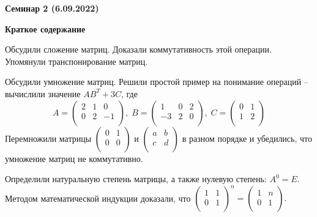 \documentclass[10pt, a4paper]{extarticle}
\theoremstyle{definition}
\begin{document}
\begin{center}
\small
\noindent{}
\end{center}

\large

\begin{center}
\textbf{Семинар 2 (6.09.2022)}
\end{center}

	\textbf{Краткое содержание}

    Обсудили сложение матриц. Доказали коммутативность этой операции. Упомянули транспонирование матриц.
    
    Обсудили умножение матриц. Решили простой пример на понимание операций -- вычислили значение $AB^T + 3C$, где
    \[
    A = \begin{pmatrix}
        2 & 1 & 0 \\
        0 & 2 & -1 \\
    \end{pmatrix}, \;
    B = \begin{pmatrix}
        1 & 0 & 2 \\
        -3 & 2 & 0 \\
    \end{pmatrix}, \;
    C = \begin{pmatrix}
        0 & 1 \\
        1 & 2 \\
    \end{pmatrix}
    \]
    Перемножили матрицы 
    $\begin{pmatrix}
        0 & 1 \\
        0 & 0 \\
    \end{pmatrix}$ 
    и
    $\begin{pmatrix}
        a & b \\
        c & d \\
    \end{pmatrix}$
    в разном порядке и убедились, что умножение матриц не коммутативно.

    Определили натуральную степень матрицы, а также нулевую степень: $A^0 = E$. Методом математической индукции доказали, что 
    $\begin{pmatrix}
        1 & 1 \\
        0 & 1 \\
    \end{pmatrix}^n = 
    \begin{pmatrix}
        1 & n \\
        0 & 1 \\
    \end{pmatrix}.$
    
\end{document}
